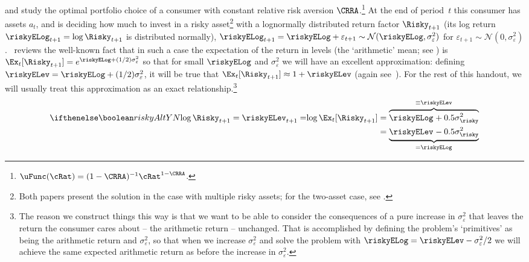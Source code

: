 
\newcommand{\scale}{x}

\newcommand{\riskyshk}{\varepsilon}
\newcommand{\riskyshkvar}{\sigma^{2}_{\riskyshk}}

\cite{merton:restat} and \cite{samuelson:portfolio} study the optimal portfolio choice of a consumer with constant relative risk aversion $\CRRA$.\footnote{$\uFunc(\cRat) = (1-\CRRA)^{-1}\cRat^{1-\CRRA}$.}  At the end of period~$t$ this consumer has assets $a_{t}$, and is deciding how much to invest in a risky asset\footnote{Both papers present the solution in the case with multiple risky assets; for the two-asset case, see .} with a lognormally distributed return factor $\Risky_{t+1}$ (its log return $\riskyELog_{t+1} = \log \Risky_{t+1}$ is distributed normally), $\riskyELog_{t+1} = \riskyELog+\riskyshk_{t+1} \sim \mathcal{N}(\riskyELog,\riskyshkvar)$ for $\riskyshk_{t+1}\sim\mathcal{N}(0,\riskyshkvar)$.  {\ELogNorm}~reviews the well-known fact that in such a case the expectation of the return in levels (the `arithmetic' mean; see \ArithmeticVSGeometric) is $\Ex_{t}[\Risky_{t+1}]=e^{\riskyELog+(1/2)\riskyshkvar}$ so that for small $\riskyELog$ and $\riskyshkvar$ we will have an excellent approximation: defining $\riskyELev=\riskyELog+(1/2)\riskyshkvar$, it will be true that $\Ex_{t}[\Risky_{t+1}] \approx 1 + \riskyELev$ (again see~{\ArithmeticVSGeometric}).  For the rest of this handout, we will usually treat this approximation as an exact relationship.\footnote{The reason we construct things this way is that we want to be able to consider the consequences of a pure increase in $\riskyshkvar$ that leaves the return the consumer cares about -- the arithmetic return -- unchanged.  That is accomplished by defining the problem's `primitives' as being the arithmetic return and $\riskyshkvar$, so that when we increase $\riskyshkvar$ and solve the problem with $\riskyELog = \riskyELev - \riskyshkvar/2$ we will achieve the same expected arithmetic return as before the increase in $\riskyshkvar$.}
\begin{equation}\begin{gathered}\begin{aligned}
    \ifriskyAlt{\log \Risky_{t+1} = \riskyELev_{t+1} = }{\log \Ex_{t}[\Risky_{t+1}]  }       & =  \overbrace{\riskyELog_{}+0.5\sigma^{2}_{\risky}}^{\equiv \riskyELev_{}}
    \\   & =  \underbrace{\riskyELev_{}-0.5\sigma^{2}_{\risky}}_{=\riskyELog_{}}
\end{aligned}\end{gathered}\end{equation}

